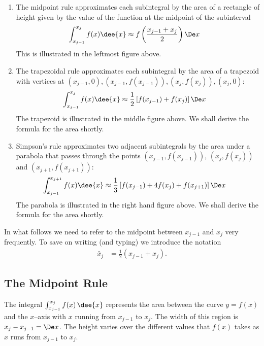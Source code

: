 \begin{enumerate}[(1)]
 \item The midpoint rule approximates each subintegral by the area of a rectangle of
height given by the value of the function at the midpoint of the subinterval
\begin{align*}
  \int_{x_{j-1}}^{x_{j}} f(x) \dee{x} & \approx f\left( \frac{x_{j-1}+x_{j}}{2} \right)
\De x
\end{align*}
This is illustrated in the leftmost figure above.

\item The trapezoidal rule approximates each subintegral by the area of a trapezoid with
vertices at $(x_{j-1},0), (x_{j-1},f(x_{j-1})), (x_{j},f(x_{j})), (x_{j},0)$:
\begin{align*}
  \int_{x_{j-1}}^{x_{j}} f(x) \dee{x}
  & \approx \frac{1}{2} \left[f(x_{j-1})+f(x_j) \right] \De x
\end{align*}
The trapezoid is illustrated in the middle figure above. We shall derive the formula
for the area shortly.

\item Simpson's rule approximates two adjacent subintegrals by the area under
a parabola that passes through the points $(x_{j-1},f(x_{j-1}))$,
$(x_{j},f(x_{j}))$ and $(x_{j+1},f(x_{j+1}))$:
\begin{align*}
  \int_{x_{j-1}}^{x_{j+1}} f(x) \dee{x}
  & \approx \frac{1}{3} \left[f(x_{j-1})+4f(x_j)+f(x_{j+1}) \right] \De x
\end{align*}
The parabola is illustrated in the right hand figure above. We shall derive the
formula for the area shortly.
\end{enumerate}

\begin{notn}[Midpoints]
In what follows we need to refer to the midpoint between $x_{j-1}$ and $x_j$ very
frequently. To save on writing (and typing) we introduce the notation
\begin{align*}
  \bar x_j &= \frac{1}{2} \left(x_{j-1}+x_j \right).
\end{align*}
  \end{notn}
\subsection{The Midpoint Rule}\label{sec:midpointRule}
The integral $\int_{x_{j-1}}^{x_j} f(x)\,\dee{x}$ represents the area between
the curve $y=f(x)$ and the $x$--axis with $x$ running from $x_{j-1}$
to $x_j$. The width of this region is $x_j-x_{j-1}=\De x$. The height varies
over the different values that $f(x)$ takes as $x$ runs from $x_{j-1}$
to $x_j$.

